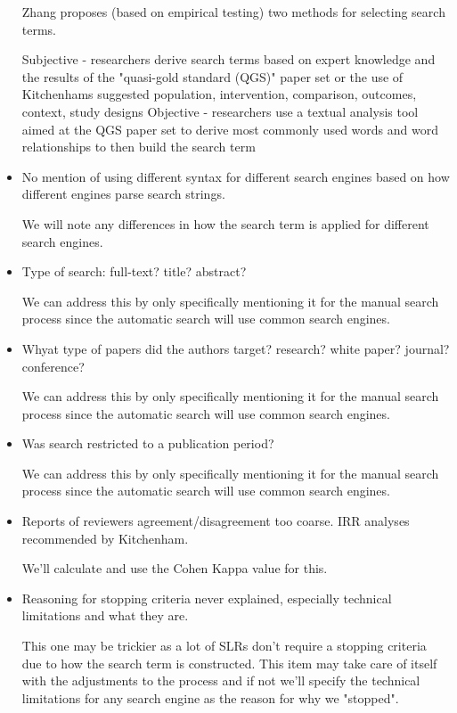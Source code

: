 \begin{itemize}
Zhang \cite{zhang2011identifying} proposes (based on empirical testing) two methods for selecting search terms.

Subjective - researchers derive search terms based on expert knowledge and the results of the "quasi-gold standard (QGS)" paper set or the use of Kitchenhams suggested population, intervention, comparison, outcomes, context, study designs
Objective - researchers use a textual analysis tool aimed at the QGS paper set to derive most commonly used words and word relationships to then build the search term

\item No mention of using different syntax for different search engines based on how different engines parse search strings.

We will note any differences in how the search term is applied for different search engines.

\item Type of search: full-text? title? abstract?

We can address this by only specifically mentioning it for the manual search process since the automatic search will use common search engines.

\item Whyat type of papers did the authors target? research? white paper? journal? conference?

We can address this by only specifically mentioning it for the manual search process since the automatic search will use common search engines.

\item Was search restricted to a publication period?

We can address this by only specifically mentioning it for the manual search process since the automatic search will use common search engines.

\item Reports of reviewers agreement/disagreement too coarse. IRR analyses recommended by Kitchenham.

We'll calculate and use the Cohen Kappa value for this.

\item Reasoning for stopping criteria never explained, especially technical limitations and what they are.

This one may be trickier as a lot of SLRs don't require a stopping criteria due to how the search term is constructed.
This item may take care of itself with the adjustments to the process and if not we'll specify the technical limitations for any search engine as the reason for why we "stopped".


\end{itemize}
